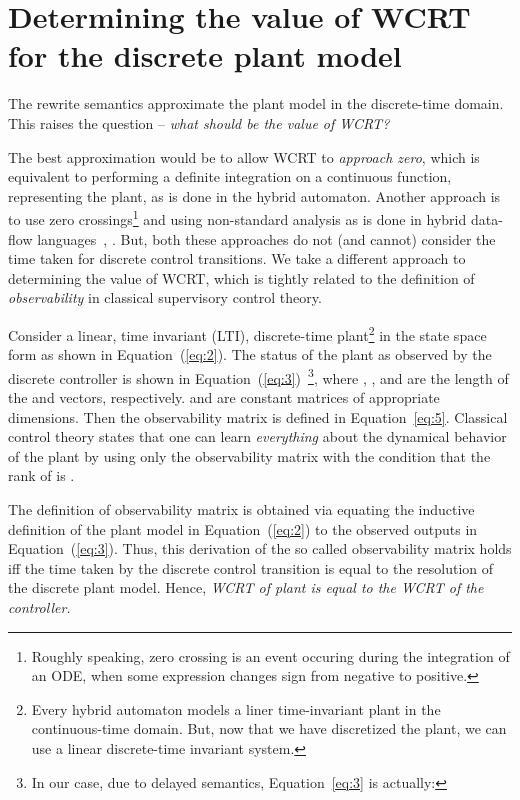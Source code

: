 \documentclass[10pt,journal,cspaper,compsoc]{IEEEtran}
\begin{document}
\section{Determining the value of WCRT for the discrete plant model}
\label{sec:determ-value-wcrt}

The rewrite semantics approximate the plant model in the discrete-time
domain. This raises the question -- \textit{what should be the value of
  WCRT?}

The best approximation would be to allow WCRT to \textit{approach zero},
which is equivalent to performing a definite integration on a continuous
function, representing the plant, as is done in the hybrid
automaton. Another approach is to use zero crossings\footnote{Roughly
  speaking, zero crossing is an event occuring during the integration of
  an ODE, when some expression changes sign from negative to positive.}
and using non-standard analysis as is done in hybrid data-flow
languages~\cite{DBLP:conf/hybrid/BourkeP13}, \cite{simulink}. But, both
these approaches do not (and cannot) consider the time taken for
discrete control transitions. We take a different approach to
determining the value of WCRT, which is tightly related to the
definition of \textit{observability} in classical supervisory control
theory.

Consider a linear, time invariant (LTI), discrete-time
plant\footnote{Every hybrid automaton models a liner time-invariant
  plant in the continuous-time domain. But, now that we have discretized
  the plant, we can use a linear discrete-time invariant system.} in the
state space form as shown in Equation~(\ref{eq:2}). The status of the
plant as observed by the discrete controller is shown in
Equation~(\ref{eq:3})~\footnote{In our case, due to delayed semantics,
  Equation~\ref{eq:3} is actually: \mbox{}}, where ,
,  and  are the length of the
 and  vectors, respectively.  and
 are constant matrices of appropriate dimensions. Then the
observability matrix  is
defined in Equation~\ref{eq:5}. Classical control theory states that one
can learn \textit{everything} about the dynamical behavior of the plant
by using only the observability matrix with the condition that the rank
of  is .

\begin{scriptsize}

\end{scriptsize}

The definition of observability matrix is obtained via equating the
inductive definition of the plant model in Equation~(\ref{eq:2}) to the
observed outputs in Equation~(\ref{eq:3}).  Thus, this derivation of the
so called observability matrix holds \textrm{iff} the time taken by the
discrete control transition is equal to the resolution of the discrete
plant model. Hence, \textit{WCRT of plant is equal to the WCRT of the
  controller.}
\end{document}
